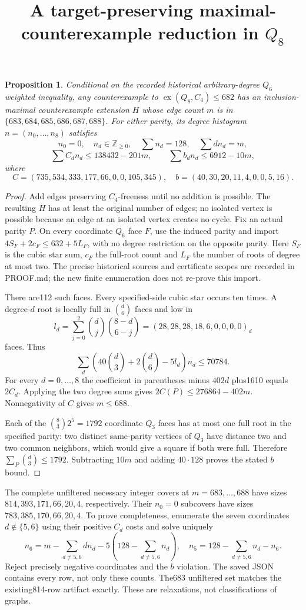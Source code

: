 \documentclass{article}
\newtheorem{proposition}{Proposition}
\begin{document}
\title{A target-preserving maximal-counterexample reduction in $Q_8$}
\maketitle
\begin{proposition}
Conditional on the recorded historical arbitrary-degree $Q_6$ weighted
inequality, any counterexample to $\operatorname{ex}(Q_8,C_4)\le682$
has an inclusion-maximal counterexample extension $H$ whose edge count
$m$ is in $\{683,684,685,686,687,688\}$. For either parity, its degree
histogram $n=(n_0,\ldots,n_8)$ satisfies
\[
n_0=0,\quad n_d\in\mathbb Z_{\ge0},\quad\sum n_d=128,
\quad\sum dn_d=m,
\]
\[
\sum C_dn_d\le138432-201m,\qquad
\sum b_dn_d\le6912-10m,
\]
where
\[
C=(735,534,333,177,66,0,0,105,345),\quad
b=(40,30,20,11,4,0,0,5,16).
\]
\end{proposition}
\begin{proof}
Add edges preserving $C_4$-freeness until no addition is possible.
The resulting $H$ has at least the original number of edges; no isolated
vertex is possible because an edge at an isolated vertex creates no cycle.
Fix an actual parity $P$. On every coordinate $Q_6$ face $F$, use the
induced parity and import $4S_F+2c_F\le632+5L_F$, with no degree
restriction on the opposite parity. Here $S_F$ is the cubic star sum,
$c_F$ the full-root count and $L_F$ the number of roots of degree at most
two. The precise historical sources and certificate scopes are recorded
in PROOF.md; the new finite enumeration does not re-prove this import.

There are112 such faces. Every specified-side cubic star occurs ten
times. A degree-$d$ root is locally full in $\binom d6$ faces and low in
\[
l_d=\sum_{j=0}^2\binom dj\binom{8-d}{6-j}
=(28,28,28,18,6,0,0,0,0)_d
\]
faces. Thus
\[
\sum_d\left(40\binom d3+2\binom d6-5l_d\right)n_d\le70784.
\]
For every $d=0,\ldots,8$ the coefficient in parentheses minus $402d$
plus1610 equals $2C_d$. Applying the two degree sums gives
$2C(P)\le276864-402m$. Nonnegativity of $C$ gives $m\le688$.

Each of the $\binom83 2^5=1792$ coordinate $Q_3$ faces has at most
one full root in the specified parity: two distinct same-parity vertices
of $Q_3$ have distance two and two common neighbors, which would give a
square if both were full. Therefore $\sum_P\binom d3\le1792$.
Subtracting $10m$ and adding $40\cdot128$ proves the stated $b$ bound.
\end{proof}

The complete unfiltered necessary integer covers at $m=683,\ldots,688$
have sizes $814,393,171,66,20,4$, respectively. Their $n_0=0$ subcovers
have sizes $783,385,170,66,20,4$. To prove completeness, enumerate the
seven coordinates $d\notin\{5,6\}$ using their positive $C_d$ costs and
solve uniquely
\[
n_6=m-\sum_{d\ne5,6}dn_d-5\left(128-\sum_{d\ne5,6}n_d\right),
\quad n_5=128-\sum_{d\ne5,6}n_d-n_6.
\]
Reject precisely negative coordinates and the $b$ violation. The saved
JSON contains every row, not only these counts. The683 unfiltered set
matches the existing814-row artifact exactly. These are relaxations,
not classifications of graphs.
\end{document}

